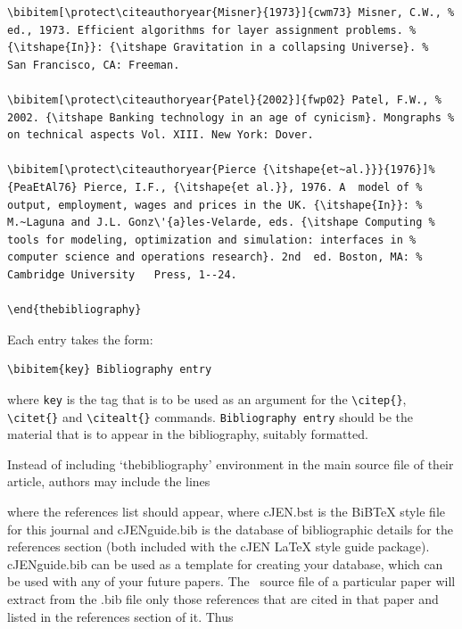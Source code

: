 \documentclass[]{cJEN2e}
\begin{document}
\begin{verbatim}
\bibitem[\protect\citeauthoryear{Misner}{1973}]{cwm73} Misner, C.W., %
ed., 1973. Efficient algorithms for layer assignment problems. %
{\itshape{In}}: {\itshape Gravitation in a collapsing Universe}. %
San Francisco, CA: Freeman.

\bibitem[\protect\citeauthoryear{Patel}{2002}]{fwp02} Patel, F.W., %
2002. {\itshape Banking technology in an age of cynicism}. Mongraphs %
on technical aspects Vol. XIII. New York: Dover.

\bibitem[\protect\citeauthoryear{Pierce {\itshape{et~al.}}}{1976}]%
{PeaEtAl76} Pierce, I.F., {\itshape{et al.}}, 1976. A  model of %
output, employment, wages and prices in the UK. {\itshape{In}}: %
M.~Laguna and J.L. Gonz\'{a}les-Velarde, eds. {\itshape Computing %
tools for modeling, optimization and simulation: interfaces in %
computer science and operations research}. 2nd  ed. Boston, MA: %
Cambridge University   Press, 1--24.

\end{thebibliography}

\end{verbatim}
\medskip
\noindent Each entry takes the form:
\medskip
\begin{verbatim}
\bibitem{key} Bibliography entry
\end{verbatim}

where {\tt key} is the tag that is to be used as an argument for the
\verb"\citep{}", \verb"\citet{}" and \verb"\citealt{}" commands.
{\tt Bibliography entry} should be the material that is to appear in
the bibliography, suitably formatted.\bigskip

Instead of including `thebibliography' environment in the main
source file of their article, authors may include the lines
\vspace{12pt}

\noindent\verb""
\newline\verb""
\vspace{12pt}

\noindent where the references list should appear, where cJEN.bst is
the BiBTeX style file for this journal and cJENguide.bib is the
database of bibliographic details for the references section (both
included with the cJEN LaTeX style guide package). cJENguide.bib can
be used as a template for creating your database, which can be used
with any of your future papers. The \LaTeXe\ source file of a
particular paper will extract from the .bib file only those
references that are cited in that paper and listed in the references
section of it. Thus\vspace{12pt}
\end{document}
